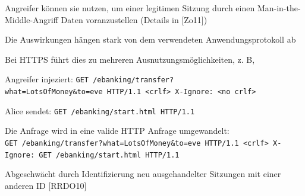 \documentclass[a4paper]{article}
\begin{document}
\begin{multicols}{3}
\begin{itemize*}
\begin{itemize*}
\begin{itemize*}
                        \begin{itemize*} \item Angreifer können sie nutzen, um einer legitimen Sitzung durch einen Man-in-the-Middle-Angriff Daten voranzustellen (Details in {[}Zo11{]}) \item Die Auswirkungen hängen stark von dem verwendeten Anwendungsprotokoll ab \end{itemize*}
                        \item Bei HTTPS führt dies zu mehreren Ausnutzungsmöglichkeiten, z. B,
                        \begin{itemize*} \item Angreifer injeziert: \texttt{GET\ /ebanking/transfer?what=LotsOfMoney\&to=eve\ HTTP/1.1\ \textless{}crlf\textgreater{}\ X-Ignore:\ \textless{}no\ crlf\textgreater{}} \item Alice sendet: \texttt{GET\ /ebanking/start.html\ HTTP/1.1} \item Die Anfrage wird in eine valide HTTP Anfrage umgewandelt: \texttt{GET\ /ebanking/transfer?what=LotsOfMoney\&to=eve\ HTTP/1.1\ \textless{}crlf\textgreater{}\ X-Ignore:\ GET\ /ebanking/start.html\ HTTP/1.1} \end{itemize*}
                        \item Abgeschwächt durch Identifizierung neu ausgehandelter Sitzungen mit einer anderen ID {[}RRDO10{]}
                  \end{itemize*}
            \end{itemize*}


\end{itemize*}
\end{multicols}
\end{document}
